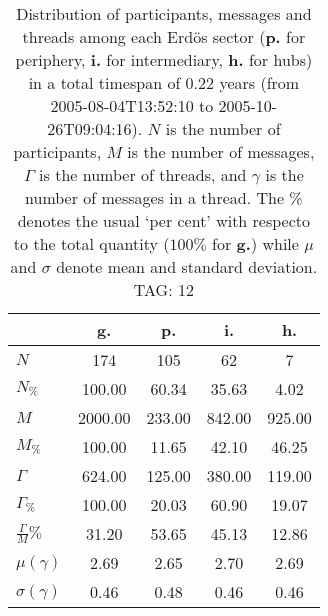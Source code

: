 \begin{table}[h!]
\begin{center}
\begin{tabular}{| l | c | c | c | c |}\hline
 & g. & p. & i. & h. \\\hline
$N$ & 174  & 105  & 62  & 7 \\\hline
$N_{\%}$ & 100.00  & 60.34  & 35.63  & 4.02 \\\hline
$M$ & 2000.00  & 233.00  & 842.00  & 925.00 \\\hline
$M_{\%}$ & 100.00  & 11.65  & 42.10  & 46.25 \\\hline
$\Gamma$ & 624.00  & 125.00  & 380.00  & 119.00 \\\hline
$\Gamma_{\%}$ & 100.00  & 20.03  & 60.90  & 19.07 \\\hline
$\frac{\Gamma}{M}\%$ & 31.20  & 53.65  & 45.13  & 12.86 \\\hline
$\mu(\gamma)$ & 2.69  & 2.65  & 2.70  & 2.69 \\\hline
$\sigma(\gamma)$ & 0.46  & 0.48  & 0.46  & 0.46 \\\hline
\end{tabular}
\caption{Distribution of participants, messages and threads among each Erd\"os sector ({\bf p.} for periphery, {\bf i.} for intermediary, 
    {\bf h.} for hubs) in a total timespan of 0.22 years (from 2005-08-04T13:52:10 to 2005-10-26T09:04:16). $N$ is the number of participants, $M$ is the number of messages, $\Gamma$ is the number of threads, and $\gamma$ is the number of messages in a thread.
    The \% denotes the usual `per cent' with respecto to the total quantity ($100\%$ for {\bf g.})
    while $\mu$ and $\sigma$ denote mean and standard deviation. TAG: 12}
\end{center}
\end{table}